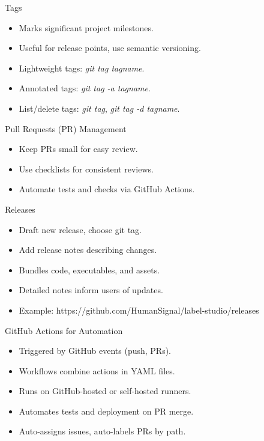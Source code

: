 \documentclass[aspectratio=169]{beamer}
\begin{document}
\begin{frame}{Tags}
    \begin{itemize}
        \item Marks significant project milestones.
        \item Useful for release points, use semantic versioning.
        \item Lightweight tags: \textit{git tag tagname}.
        \item Annotated tags: \textit{git tag -a tagname}.
        \item List/delete tags: \textit{git tag}, \textit{git tag -d tagname}.
    \end{itemize}
\end{frame}    
\begin{frame}{Pull Requests (PR) Management}
    \begin{itemize}
        \item Keep PRs small for easy review.
        \item Use checklists for consistent reviews.
        \item Automate tests and checks via GitHub Actions.
    \end{itemize}
\end{frame}
\begin{frame}{Releases}
    \begin{itemize}
        \item Draft new release, choose git tag.
        \item Add release notes describing changes.
        \item Bundles code, executables, and assets.
        \item Detailed notes inform users of updates.
        \item Example: https://github.com/HumanSignal/label-studio/releases
    \end{itemize}
\end{frame}
\begin{frame}{GitHub Actions for Automation}
    \begin{itemize}
        \item Triggered by GitHub events (push, PRs).
        \item Workflows combine actions in YAML files.
        \item Runs on GitHub-hosted or self-hosted runners.
        \item Automates tests and deployment on PR merge.
        \item Auto-assigns issues, auto-labels PRs by path.
    \end{itemize}
\end{frame}
\end{document}
